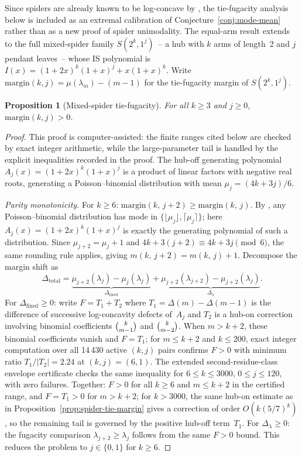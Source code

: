 \documentclass[12pt,oneside]{article}
\newtheorem{proposition}[theorem]{Proposition}
\theoremstyle{remark}
\begin{document}
Since spiders are already known to be log-concave by \textcite{li2025spiders}, the tie-fugacity analysis below is included as an extremal calibration of Conjecture~\ref{conj:mode-mean} rather than as a new proof of spider unimodality.
The equal-arm result extends to the full mixed-spider family $S(2^k, 1^j)$~-- a hub with $k$ arms of length~2 and $j$ pendant leaves~-- whose IS polynomial is $I(x) = (1+2x)^k(1+x)^j + x(1+x)^k$.
Write $\mathrm{margin}(k,j) = \mu(\lambda_m) - (m-1)$ for the tie-fugacity margin of $S(2^k, 1^j)$.

\begin{proposition}[Mixed-spider tie-fugacity]\label{prop:mixed-spider-tiefug}
  For all $k \ge 3$ and $j \ge 0$, $\mathrm{margin}(k,j) > 0$.
\end{proposition}

\begin{proof}
This proof is computer-assisted: the finite ranges cited below are checked by exact integer arithmetic, while the large-parameter tail is handled by the explicit inequalities recorded in the proof.
The hub-off generating polynomial $A_j(x) = (1+2x)^k(1+x)^j$ is a product of linear factors with negative real roots, generating a Poisson--binomial distribution with mean $\mu_j = (4k+3j)/6$.

\textit{Parity monotonicity.}
For $k \ge 6$: $\mathrm{margin}(k,\, j+2) \ge \mathrm{margin}(k,\, j)$.
By \textcite{darroch1964}, any Poisson--binomial distribution has mode in $\{\lfloor\mu_j\rfloor, \lceil\mu_j\rceil\}$; here $A_j(x) = (1+2x)^k(1+x)^j$ is exactly the generating polynomial of such a distribution.
Since $\mu_{j+2} = \mu_j + 1$ and $4k + 3(j+2) \equiv 4k + 3j \pmod{6}$, the same rounding rule applies, giving $m(k,\, j+2) = m(k,\, j) + 1$.
Decompose the margin shift as
\[
  \Delta_{\mathrm{total}}
  = \underbrace{\mu_{j+2}(\lambda_j) - \mu_j(\lambda_j)}_{\Delta_{\mathrm{fixed}}}
  + \underbrace{\mu_{j+2}(\lambda_{j+2}) - \mu_{j+2}(\lambda_j)}_{\Delta_\lambda}.
\]
For $\Delta_{\mathrm{fixed}} \ge 0$: write $F = T_1 + T_2$ where $T_1 = \Delta(m) - \Delta(m{-}1)$ is the difference of successive log-concavity defects of~$A_j$ and $T_2$ is a hub-on correction involving binomial coefficients $\tbinom{k}{m{-}1}$ and $\tbinom{k}{m{-}2}$.
When $m > k+2$, these binomial coefficients vanish and $F = T_1$; for $m \le k+2$ and $k \le 200$, exact integer computation over all 14\,430 active $(k,j)$ pairs confirms $F > 0$ with minimum ratio $T_1/|T_2| = 2.24$ at $(k,j) = (6,1)$.
The extended second-residue-class envelope certificate  checks the same inequality for $6\le k\le3000$, $0\le j\le120$, with zero failures.
Together: $F > 0$ for all $k \ge 6$ and $m \le k+2$ in the certified range, and $F = T_1 > 0$ for $m > k+2$; for $k > 3000$, the same hub-on estimate as in Proposition~\ref{prop:spider-tie-margin} gives a correction of order $O(k(5/7)^k)$, so the remaining tail is governed by the positive hub-off term~$T_1$.
For $\Delta_\lambda \ge 0$: the fugacity comparison $\lambda_{j+2} \ge \lambda_j$ follows from the same $F > 0$ bound.
This reduces the problem to $j \in \{0, 1\}$ for $k \ge 6$.


\end{proof}
\end{document}
